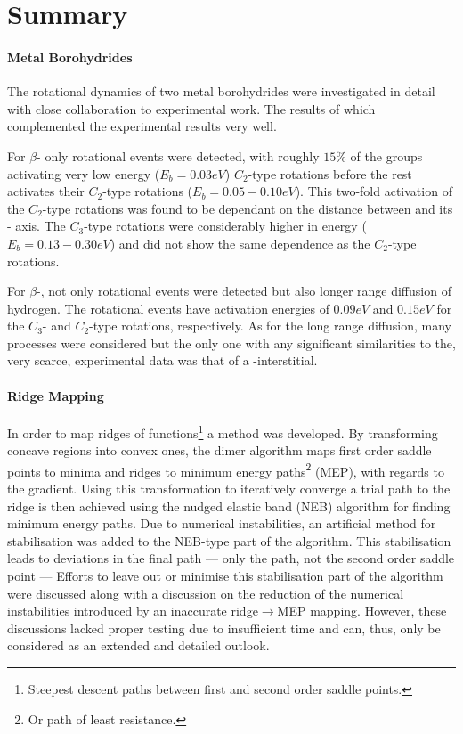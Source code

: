 \chapter{Summary}
\label{chap:summary}

\vspace{3em}
\subsubsection{Metal Borohydrides}
The rotational dynamics of two metal borohydrides were investigated in detail with close collaboration to experimental work.
The results of which complemented the experimental results very well.

For $\beta$- only rotational events were detected, with roughly $15\%$ of the  groups activating very low energy ($E_b = 0.03\unit{eV}$) $C_2$-type rotations before the rest activates their $C_2$-type rotations ($E_b = 0.05 - 0.10 \unit{eV}$).
This two-fold activation of the $C_2$-type rotations was found to be dependant on the distance between  and its - axis.
The $C_3$-type rotations were considerably higher in energy ($E_b = 0.13 - 0.30 \unit{eV}$) and did not show the same dependence as the $C_2$-type rotations.

For $\beta$-, not only rotational events were detected but also longer range diffusion of hydrogen.
The rotational events have activation energies of $0.09 \unit{eV}$ and $0.15\unit{eV}$ for the $C_3$- and $C_2$-type rotations, respectively.
As for the long range diffusion, many processes were considered but the only one with any significant similarities to the, very scarce, experimental data was that of a -interstitial.

\subsubsection{Ridge Mapping}
In order to map ridges of functions\footnote{Steepest descent paths between first and second order saddle points.} a method was developed.
By transforming concave regions into convex ones, the dimer algorithm maps first order saddle points to minima and ridges to minimum energy paths\footnote{Or path of least resistance.} (MEP), with regards to the gradient.
Using this transformation to iteratively converge a trial path to the ridge is then achieved using the nudged elastic band (NEB) algorithm for finding minimum energy paths.
Due to numerical instabilities, an artificial method for stabilisation was added to the NEB-type part of the algorithm.
This stabilisation leads to deviations in the final path --- only the path, not the second order saddle point ---
Efforts to leave out or minimise this stabilisation part of the algorithm were discussed along with a discussion on the reduction of the numerical instabilities introduced by an inaccurate ridge$\rightarrow$MEP mapping.
However, these discussions lacked proper testing due to insufficient time and can, thus, only be considered as an extended and detailed outlook.

